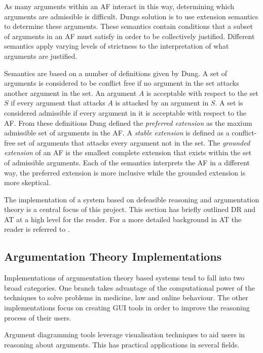 As many arguments within an AF interact in this way, determining which arguments are admissible is difficult. Dungs solution is to use extension semantics to determine these arguments. These semantics contain conditions that a subset of arguments in an AF must satisfy in order to be collectively justified. Different semantics apply varying levels of strictness to the interpretation of what arguments are justified.

Semantics are based on a number of definitions given by Dung. A set of arguments is considered to be conflict free if no argument in the set attacks another argument in the set. An argument $A$ is acceptable with respect to the set $S$ if every argument that attacks $A$ is attacked by an argument in $S$. A set is considered admissible if every argument in it is acceptable with respect to the AF. From these definitions Dung defined the \textit{preferred extension} as the maxium admissible set of arguments in the AF. A \textit{stable extension} is defined as a conflict-free set of arguments that attacks every argument not in the set. The \textit{grounded extension} of an AF is the smallest complete extension that exists within the set of admissible arguments. Each of the semantics interprets the AF in a different way, the preferred extension is more inclusive while the grounded extension is more skeptical.

The implementation of a system based on defeasible reasoning and argumentation theory is a central focus of this project. This section has briefly outlined DR and AT at a high level for the reader. For a more detailed background in AT the reader is referred to \cite{bench2007argumentation}.

\subsection{Argumentation Theory Implementations}
\label{sec:dr_implementations}

Implementations of argumentation theory based systems tend to fall into two broad categories. One branch takes advantage of the computational power of the techniques to solve problems in medicine, law and online behaviour. The other implementations focus on creating GUI tools in order to improve the reasoning process of their users.

Argument diagramming tools leverage visualisation techniques to aid users in reasoning about arguments. This has practical applications in several fields.

